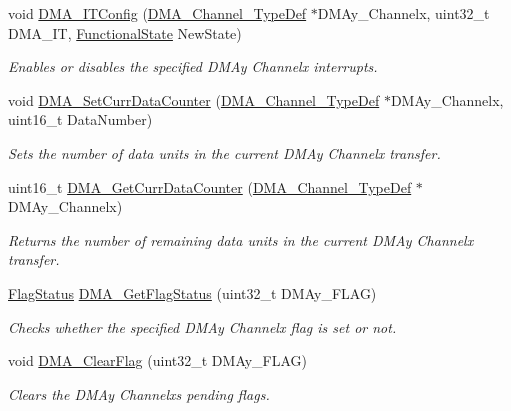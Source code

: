 \begin{DoxyCompactItemize}
void \hyperlink{group___d_m_a___exported___functions_ga0bb60360be9cd57f96399be2f3b5eb2b}{D\+M\+A\+\_\+\+I\+T\+Config} (\hyperlink{struct_d_m_a___channel___type_def}{D\+M\+A\+\_\+\+Channel\+\_\+\+Type\+Def} $\ast$D\+M\+Ay\+\_\+\+Channelx, uint32\+\_\+t D\+M\+A\+\_\+\+IT, \hyperlink{group___exported__types_gac9a7e9a35d2513ec15c3b537aaa4fba1}{Functional\+State} New\+State)
\begin{DoxyCompactList}\small\item\em Enables or disables the specified D\+M\+Ay Channelx interrupts. \end{DoxyCompactList}\item 
void \hyperlink{group___d_m_a___exported___functions_gade5d9e532814eaa46514cb385fdff709}{D\+M\+A\+\_\+\+Set\+Curr\+Data\+Counter} (\hyperlink{struct_d_m_a___channel___type_def}{D\+M\+A\+\_\+\+Channel\+\_\+\+Type\+Def} $\ast$D\+M\+Ay\+\_\+\+Channelx, uint16\+\_\+t Data\+Number)
\begin{DoxyCompactList}\small\item\em Sets the number of data units in the current D\+M\+Ay Channelx transfer. \end{DoxyCompactList}\item 
uint16\+\_\+t \hyperlink{group___d_m_a___exported___functions_ga511b4c402d1ff32d53f28736956cac5d}{D\+M\+A\+\_\+\+Get\+Curr\+Data\+Counter} (\hyperlink{struct_d_m_a___channel___type_def}{D\+M\+A\+\_\+\+Channel\+\_\+\+Type\+Def} $\ast$D\+M\+Ay\+\_\+\+Channelx)
\begin{DoxyCompactList}\small\item\em Returns the number of remaining data units in the current D\+M\+Ay Channelx transfer. \end{DoxyCompactList}\item 
\hyperlink{group___exported__types_ga89136caac2e14c55151f527ac02daaff}{Flag\+Status} \hyperlink{group___d_m_a___exported___functions_gafb30b7a891834c267eefd5d30b688a9f}{D\+M\+A\+\_\+\+Get\+Flag\+Status} (uint32\+\_\+t D\+M\+Ay\+\_\+\+F\+L\+AG)
\begin{DoxyCompactList}\small\item\em Checks whether the specified D\+M\+Ay Channelx flag is set or not. \end{DoxyCompactList}\item 
void \hyperlink{group___d_m_a___exported___functions_ga25cdca360f309c8ceb7c206cd9ad9119}{D\+M\+A\+\_\+\+Clear\+Flag} (uint32\+\_\+t D\+M\+Ay\+\_\+\+F\+L\+AG)
\begin{DoxyCompactList}\small\item\em Clears the D\+M\+Ay Channelx\textquotesingle{}s pending flags. \end{DoxyCompactList}\item 

\end{DoxyCompactItemize}
